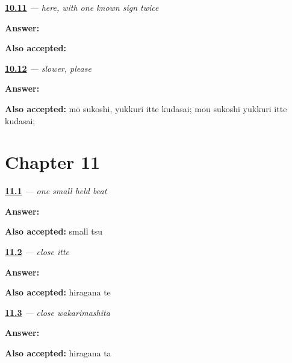 \noindent\begin{minipage}[t]{\linewidth}
\raggedright
\hyperlink{review-JA-C10-koko-write}{\textbf{10.11}} \emph{ — here, with one known sign twice}\par
\small \textbf{Answer:} \par
\footnotesize \textbf{Also accepted:} 
\end{minipage}\par\medskip

\noindent\begin{minipage}[t]{\linewidth}
\raggedright
\hyperlink{review-JA-C10-slower-please-performance}{\textbf{10.12}} \emph{ — slower, please}\par
\small \textbf{Answer:} \par
\footnotesize \textbf{Also accepted:} mō sukoshi, yukkuri itte kudasai; mou sukoshi yukkuri itte kudasai; 
\end{minipage}\par\medskip

\section*{Chapter 11}

\noindent\begin{minipage}[t]{\linewidth}
\raggedright
\hyperlink{review-JA-W11-small-tsu-write}{\textbf{11.1}} \emph{ — one small held beat}\par
\small \textbf{Answer:} \par
\footnotesize \textbf{Also accepted:} small tsu
\end{minipage}\par\medskip

\noindent\begin{minipage}[t]{\linewidth}
\raggedright
\hyperlink{review-JA-W11-te-write}{\textbf{11.2}} \emph{ — close \emph{itte}}\par
\small \textbf{Answer:} \par
\footnotesize \textbf{Also accepted:} hiragana te
\end{minipage}\par\medskip

\noindent\begin{minipage}[t]{\linewidth}
\raggedright
\hyperlink{review-JA-W11-ta-write}{\textbf{11.3}} \emph{ — close \emph{wakarimashita}}\par
\small \textbf{Answer:} \par
\footnotesize \textbf{Also accepted:} hiragana ta
\end{minipage}\par\medskip


